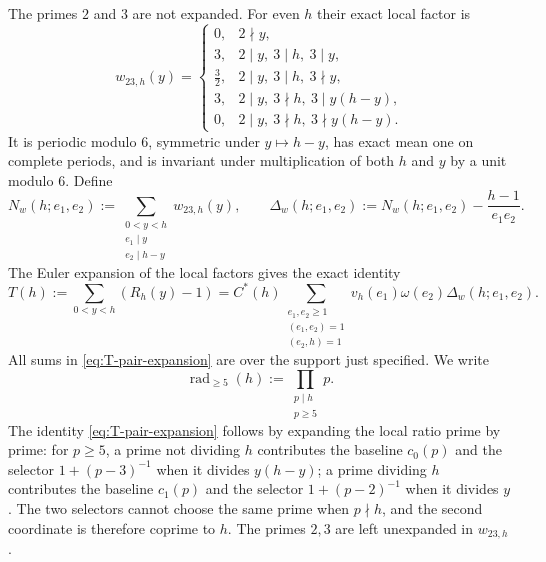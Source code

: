 \documentclass[11pt]{article}
\theoremstyle{definition}
\theoremstyle{remark}
\newcommand{\rad}{\operatorname{rad}}
\newcommand{\e}{\mathrm e}
\newcommand{\1}{\mathbf 1}
\newcommand{\om}{\omega}
\begin{document}
The primes $2$ and $3$ are not expanded.  For even $h$ their exact local
factor is
\begin{equation}\label{eq:w23}
w_{23,h}(y)=
\begin{cases}
0,&2\nmid y,\\
3,&2\mid y,\ 3\mid h,\ 3\mid y,\\
\frac32,&2\mid y,\ 3\mid h,\ 3\nmid y,\\
3,&2\mid y,\ 3\nmid h,\ 3\mid y(h-y),\\
0,&2\mid y,\ 3\nmid h,\ 3\nmid y(h-y).
\end{cases}
\end{equation}
It is periodic modulo $6$, symmetric under $y\mapsto h-y$, has exact mean
one on complete periods, and is invariant under multiplication of both $h$
and $y$ by a unit modulo $6$.  Define
\begin{equation}\label{eq:Delta-def}
N_w(h;e_1,e_2)
 :=\sum_{\substack{0<y<h\\e_1\mid y\\e_2\mid h-y}}w_{23,h}(y),
\qquad
\Delta_w(h;e_1,e_2)
 :=N_w(h;e_1,e_2)-\frac{h-1}{e_1e_2}.
\end{equation}
The Euler expansion of the local factors gives the exact identity
\begin{equation}\label{eq:T-pair-expansion}
T(h):=\sum_{0<y<h}(R_h(y)-1)
 =C^*(h)
 \sum_{\substack{e_1,e_2\ge1\\(e_1,e_2)=1\\(e_2,h)=1}}
 v_h(e_1)\om(e_2)\Delta_w(h;e_1,e_2).
\end{equation}
All sums in \cref{eq:T-pair-expansion} are over the support just specified.  We write
\[
\rad_{\ge5}(h):=\prod_{\substack{p\mid h\\p\ge5}}p.
\]
The identity \cref{eq:T-pair-expansion} follows by expanding the local ratio prime by prime: for $p\ge5$, a prime not dividing $h$ contributes the baseline $c_0(p)$ and the selector $1+(p-3)^{-1}$ when it divides $y(h-y)$; a prime dividing $h$ contributes the baseline $c_1(p)$ and the selector $1+(p-2)^{-1}$ when it divides $y$.  The two selectors cannot choose the same prime when $p\nmid h$, and the second coordinate is therefore coprime to $h$.  The primes $2,3$ are left unexpanded in $w_{23,h}$.
\end{document}
